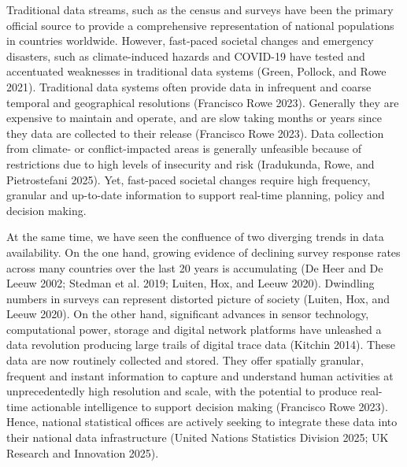 \documentclass{article}
\begin{document}
Traditional data streams, such as the census and surveys have been the
primary official source to provide a comprehensive representation of
national populations in countries worldwide. However, fast-paced
societal changes and emergency disasters, such as climate-induced
hazards and COVID-19 have tested and accentuated weaknesses in
traditional data systems (Green, Pollock, and Rowe 2021). Traditional data systems often
provide data in infrequent and coarse temporal and geographical
resolutions (Francisco Rowe 2023). Generally they are expensive to maintain
and operate, and are slow taking months or years since they data are
collected to their release (Francisco Rowe 2023). Data collection from
climate- or conflict-impacted areas is generally unfeasible because of
restrictions due to high levels of insecurity and risk
(Iradukunda, Rowe, and Pietrostefani 2025). Yet, fast-paced societal changes require high
frequency, granular and up-to-date information to support real-time
planning, policy and decision making.

At the same time, we have seen the confluence of two diverging trends in
data availability. On the one hand, growing evidence of declining survey
response rates across many countries over the last 20 years is
accumulating (De Heer and De Leeuw 2002; Stedman et al. 2019; Luiten, Hox, and Leeuw 2020). Dwindling
numbers in surveys can represent distorted picture of society
(Luiten, Hox, and Leeuw 2020). On the other hand, significant advances in sensor
technology, computational power, storage and digital network platforms
have unleashed a data revolution producing large trails of digital trace
data (Kitchin 2014). These data are now routinely collected and
stored. They offer spatially granular, frequent and instant information
to capture and understand human activities at unprecedentedly high
resolution and scale, with the potential to produce real-time actionable
intelligence to support decision making (Francisco Rowe 2023). Hence,
national statistical offices are actively seeking to integrate these
data into their national data infrastructure (United Nations Statistics Division 2025; UK Research and Innovation 2025).
\end{document}
